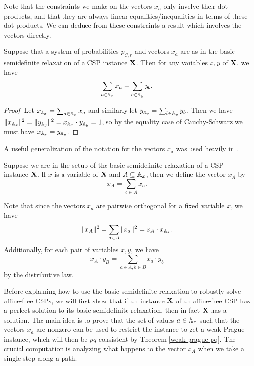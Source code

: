 \documentclass[letterpaper,11pt]{article}
\begin{document}
Note that the constraints we make on the vectors $x_a$ only involve their dot products, and that they are always linear equalities/inequalities in terms of these dot products. We can deduce from these constraints a result which involves the vectors directly.

\begin{prop} Suppose that a system of probabilities $p_{C,r}$ and vectors $x_a$ are as in the basic semidefinite relaxation of a CSP instance $\mathbf{X}$. Then for any variables $x,y$ of $\mathbf{X}$, we have
\[
\sum_{a \in \mathbb{A}_x} x_a = \sum_{b \in \mathbb{A}_y} y_b.
\]
\end{prop}
\begin{proof} Let $x_{\mathbb{A}_x} = \sum_{a \in \mathbb{A}_x} x_a$ and similarly let $y_{\mathbb{A}_y} = \sum_{b \in \mathbb{A}_y} y_b$. Then we have $\|x_{\mathbb{A}_x}\|^2 = \|y_{\mathbb{A}_y}\|^2 = x_{\mathbb{A}_x}\cdot y_{\mathbb{A}_y} = 1$, so by the equality case of Cauchy-Schwarz we must have $x_{\mathbb{A}_x} = y_{\mathbb{A}_y}$.
\end{proof}

A useful generalization of the notation for the vectors $x_a$ was used heavily in \cite{sdp}.

\begin{defn} Suppose we are in the setup of the basic semidefinite relaxation of a CSP instance $\mathbf{X}$. If $x$ is a variable of $\mathbf{X}$ and $A \subseteq \mathbb{A}_x$, then we define the vector $x_A$ by
\[
x_A = \sum_{a \in A} x_a.
\]
\end{defn}

Note that since the vectors $x_a$ are pairwise orthogonal for a fixed variable $x$, we have
\[
\|x_A\|^2 = \sum_{a \in A} \|x_a\|^2 = x_A \cdot x_{\mathbb{A}_x}.
\]
Additionally, for each pair of variables $x,y$, we have
\[
x_A \cdot y_B = \sum_{a \in A, b \in B} x_a\cdot y_b
\]
by the distributive law.

Before explaining how to use the basic semidefinite relaxation to robustly solve affine-free CSPs, we will first show that if an instance $\mathbf{X}$ of an affine-free CSP has a perfect solution to its basic semidefinite relaxation, then in fact $\mathbf{X}$ has a solution. The main idea is to prove that the set of values $a \in \mathbb{A}_x$ such that the vectors $x_a$ are nonzero can be used to restrict the instance to get a weak Prague instance, which will then be $pq$-consistent by Theorem \ref{weak-prague-pq}. The crucial computation is analyzing what happens to the vector $x_A$ when we take a single step along a path.
\end{document}
